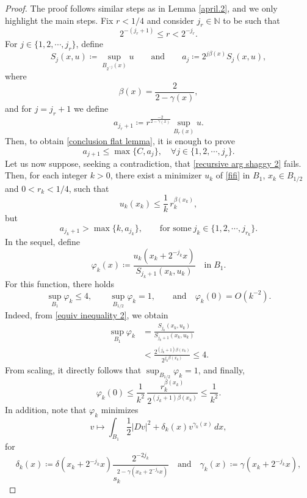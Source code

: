 \documentclass[reqno,11pt]{amsart}
\newcommand{\1}{\mathds{1}}
\numberwithin{equation}{section}
\begin{document}
\begin{proof}
The proof follows similar steps as in Lemma \ref{april.2}, and we only highlight the main steps. Fix $r<1/4$ and consider $j_r \in \mathbb{N}$ to be such that
$$
    2^{-(j_r+1)} \leq r < 2^{-j_r}.
$$
For $j \in \{1, 2, \cdots, j_r \}$, define
$$
    S_j(x,u) \coloneqq \sup_{B_{2^{-j}}(x)}u \qquad \text{and} \qquad a_j \coloneqq 2^{j \beta(x)}S_j(x,u),
$$
where
$$
    \beta(x) = \frac{2}{2-\gamma(x)},
$$
and for $j=j_r+1$ we define
$$
    a_{j_r + 1} \coloneqq r^{\frac{-2}{2-\gamma(x)}}\sup_{B_r(x)}u.
$$
Then, to obtain \eqref{conclusion flat lemma}, it is enough to prove 
\begin{equation}\label{recursive arg shaggy 2}
    a_{j+1} \leq \max\{C,a_j\}, \quad \forall j \in \{1, 2, \cdots, j_r\}.
\end{equation}
Let us now suppose, seeking a contradiction, that \eqref{recursive arg shaggy 2} fails. Then, for each integer $k>0$, there exist a minimizer $u_k$ of \eqref{fifi} in $B_1$, $x_k \in B_{1/2}$ and $ 0< r_k < 1/4$, such that 
$$
    u_k(x_k) \le \frac{1}{k} \, r_k^{\beta(x_k)},
$$
but
\begin{equation}\label{equiv inequality 2}
    a_{j_k + 1} > \max\{k,a_{j_k}\}, \qquad \text{for some} \ j_k \in \{1,2,\cdots, j_{r_k}\}.
\end{equation}
In the sequel, define
$$
    \varphi_k(x)\coloneqq \frac{u_k(x_k+2^{-j_k}x)}{S_{j_k + 1}(x_k,u_k)} \quad \text{in} \; B_1.
$$
For this function, there holds
\begin{equation}\label{this better work 2}
    \sup_{B_1} \varphi_k \leq 4, \qquad \sup_{B_{1/2}} \varphi_k = 1, \qquad \text{and} \quad \varphi_k(0) = O(k^{-2}).
\end{equation}
Indeed, from \eqref{equiv inequality 2}, we obtain
\begin{align*}
    \sup_{B_1} \varphi_k  & = \frac{S_{j_k}(x_k,u_k)}{S_{j_k + 1}(x_k,u_k)}\\ 
    & < \frac{2^{(j_k+1)\beta(x_k)}}{2^{j_k\beta(x_k)}} \leq 4 .
\end{align*}
From scaling, it directly follows that $\sup_{B_{1/2}} \varphi_k = 1$, and finally,
$$
    \varphi_k(0) \leq \frac{1}{k^2}\,\frac{r_k^{\beta(x_k)}}{2^{(j_k+1)\beta(x_k)}} \leq \frac{1}{k^2}.
$$
In addition, note that $\varphi_k$ minimizes
$$
    v \longmapsto \int_{B_1} \frac{1}{2} \left| Dv \right|^2 + \delta_k(x) v^{\gamma_k(x)}\, dx,
$$
for
$$
    \delta_k(x)\coloneqq  \delta(x_k+2^{-j_k}x)\frac{2^{-2j_k}}{s_k^{2-\gamma(x_k+2^{-j_k}x)}} \quad \text{and} \quad \gamma_k(x)\coloneqq \gamma(x_k+2^{-j_k}x),
$$
\end{proof}
\end{document}
